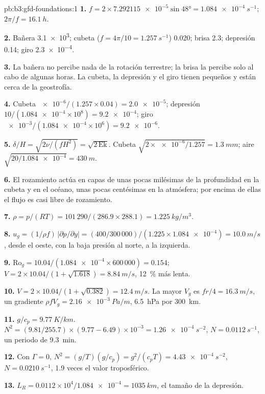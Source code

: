 \begin{solution}{pb:b3:gfd-foundations:1}
\textbf{1.} $f = 2\times\num{7.292115e-5}\sin\ang{48} =
\qty{1.084e-4}{s^{-1}}$; $2\pi/f = \qty{16.1}{h}$.

\textbf{2.} Bañera \num{3.1e3}; cubeta ($f = 4\pi/10 = \qty{1.257}{s^{-1}}$)
0.020; brisa 2.3; depresión 0.14; giro \num{2.3e-4}.

\textbf{3.} La bañera no percibe nada de la rotación terrestre; la brisa
la percibe solo al cabo de algunas horas. La cubeta, la depresión y el giro tienen
 pequeños y están cerca de la geostrofía.

\textbf{4.} Cubeta $\num{e-6}/(1.257\times0.04) = \num{2.0e-5}$; depresión
$10/(\num{1.084e-4}\times10^8) = \num{9.2e-4}$; giro
$\num{e-3}/(\num{1.084e-4}\times10^6) = \num{9.2e-6}$.

\textbf{5.} $\delta/H = \sqrt{2\nu/(fH^2)} = \sqrt{2\,\mathrm{Ek}}$. Cubeta
$\sqrt{2\times\num{e-6}/1.257} = \qty{1.3}{mm}$; aire $\sqrt{20/\num{1.084e-4}}
= \qty{430}{m}$.

\textbf{6.} El rozamiento actúa en capas de unas pocas milésimas de la profundidad en la
cubeta y en el océano, unas pocas centésimas en la atmósfera; por encima de ellas el flujo
es casi libre de rozamiento.

\textbf{7.} $\rho = p/(RT) = 101\,290/(286.9\times288.1) =
\qty{1.225}{kg/m^3}$.

\textbf{8.} $u_g = (1/\rho f)\,|\partial p/\partial y| = (400/300\,000)/(1.225
\times\num{1.084e-4}) = \qty{10.0}{m/s}$, desde el oeste, con la baja
presión al norte, a la izquierda.

\textbf{9.} $\mathrm{Ro}_g = 10.04/(\num{1.084e-4}\times600\,000) = 0.154$;
$V = 2\times10.04/(1 + \sqrt{1.618}) = \qty{8.84}{m/s}$, \qty{12}{\percent}
más lenta.

\textbf{10.} $V = 2\times10.04/(1 + \sqrt{0.382}) = \qty{12.4}{m/s}$. La
mayor $V_g$ es $fr/4 = \qty{16.3}{m/s}$, un gradiente $\rho fV_g =
\qty{2.16e-3}{Pa/m}$, \qty{6.5}{hPa} por \qty{300}{km}.

\textbf{11.} $g/c_p = \qty{9.77}{K/km}$. $N^2 = (9.81/255.7)\times(9.77 -
6.49)\times10^{-3} = \qty{1.26e-4}{s^{-2}}$, $N = \qty{0.0112}{s^{-1}}$, un
periodo de \qty{9.3}{min}.

\textbf{12.} Con $\Gamma = 0$, $N^2 = (g/T)(g/c_p) = g^2/(c_pT) =
\qty{4.43e-4}{s^{-2}}$, $N = \qty{0.0210}{s^{-1}}$, 1.9 veces el
valor troposférico.

\textbf{13.} $L_R = 0.0112\times10^4/\num{1.084e-4} = \qty{1035}{km}$, el
tamaño de la depresión.


\end{solution}
